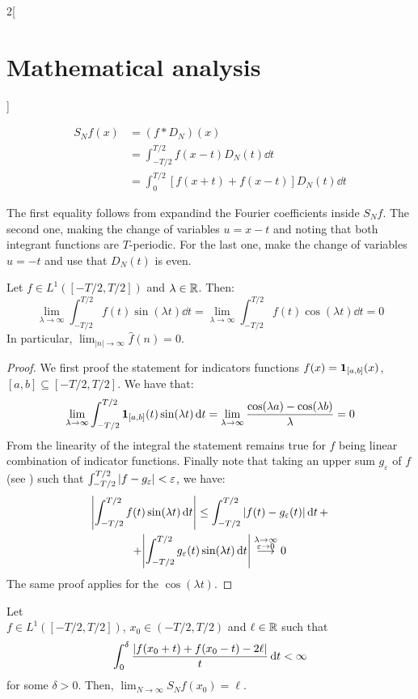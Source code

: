 \documentclass[../../../main_math.tex]{subfiles}
\begin{document}
\begin{multicols}{2}[\section{Mathematical analysis}]
\begin{proposition}
    \begin{align*}
      S_Nf(x) & =(f*D_N)(x)                              \\
              & =\int_{-T/2}^{T/2}f(x-t)D_N(t)\dd{t}     \\
              & =\int_0^{T/2}[f(x+t)+f(x-t)]D_N(t)\dd{t}
    \end{align*}
  \end{proposition}
  \begin{sproof}
    The first equality follows from expandind the Fourier coefficients inside $S_Nf$. The second one, making the change of variables $u=x-t$ and noting that both integrant functions are $T$-periodic. For the last one, make the change of variables $u=-t$ and use that $D_N(t)$ is even.
  \end{sproof}
  \begin{lemma}\label{MA:riemannlebesgue}
    Let $f\in L^1([-T/2,T/2])$ and $\lambda\in\mathbb{R} $. Then: $$\lim_{\lambda\to\infty}\int_{-T/2}^{T/2}f(t)\sin(\lambda t)\dd{t}=\lim_{\lambda\to\infty}\int_{-T/2}^{T/2}f(t)\cos(\lambda t)\dd{t}=0$$ In particular, $\displaystyle\lim_{|n|\to\infty}\widehat{f}(n)=0$.
  \end{lemma}
  \begin{proof}
    We first proof the statement for indicators functions $f(x)=\boldsymbol{\mathrm{1}}_{[a,b]}(x)$, $[a,b]\subseteq [-T/2,T/2]$. We have that:
    $$\lim_{\lambda\to\infty}\int_{-T/2}^{T/2}\boldsymbol{\mathrm{1}}_{[a,b]}(t)\sin(\lambda t)\dd{t}=\lim_{\lambda\to\infty}\frac{\cos(\lambda a)-\cos(\lambda b)}{\lambda}=0$$
    From the linearity of the integral the statement remains true for $f$ being linear combination of indicator functions. Finally note that taking an upper sum $g_\varepsilon$ of $f$ (see ) such that $\int_{-T/2}^{T/2}\abs{f-g_\varepsilon}<\varepsilon$, we have:
    \begin{multline*}
      \abs{\int_{-T/2}^{T/2}f(t)\sin(\lambda t)\dd{t}}\leq\int_{-T/2}^{T/2}\abs{f(t)-g_\varepsilon(t)}\dd{t}+\\+\abs{\int_{-T/2}^{T/2}g_\varepsilon(t)\sin(\lambda t)\dd{t}}\overset{\substack{\lambda\to\infty\\\varepsilon\to 0}}{\longrightarrow}0
    \end{multline*}
    The same proof applies for the $\cos(\lambda t)$.
  \end{proof}
  \begin{theorem}\label{MA:dini}
    Let \\$f\in L^1([-T/2,T/2])$, $x_0\in (-T/2,T/2)$ and $\ell\in\mathbb{R} $ such that $$\int_0^\delta\frac{\abs{f(x_0+t)+f(x_0-t)-2\ell}}{t}\dd{t}<\infty$$ for some $\delta>0$. Then, $\displaystyle\lim_{N\to\infty}S_Nf(x_0)=\ell$.

\end{theorem}
\end{multicols}
\end{document}
